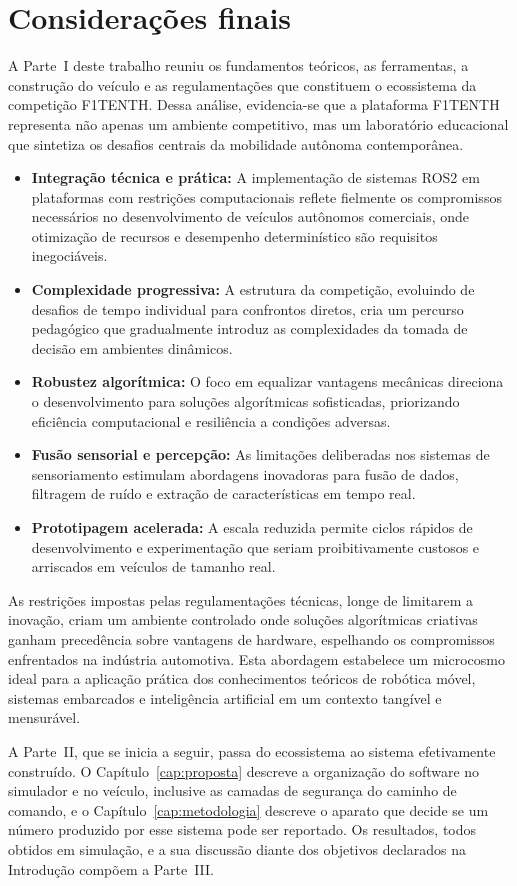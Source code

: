 \chapter{Considerações finais}

A Parte~I deste trabalho reuniu os fundamentos teóricos, as ferramentas, a
construção do veículo e as regulamentações que constituem o ecossistema da
competição F1TENTH. Dessa análise, evidencia-se que a plataforma
F1TENTH representa não apenas um ambiente competitivo, mas um laboratório
educacional que sintetiza os desafios centrais da mobilidade autônoma
contemporânea.

\begin{itemize}
    \item \textbf{Integração técnica e prática:} A implementação de sistemas ROS2 em plataformas com restrições computacionais reflete fielmente os compromissos necessários no desenvolvimento de veículos autônomos comerciais, onde otimização de recursos e desempenho determinístico são requisitos inegociáveis.

    \item \textbf{Complexidade progressiva:} A estrutura da competição, evoluindo de desafios de tempo individual para confrontos diretos, cria um percurso pedagógico que gradualmente introduz as complexidades da tomada de decisão em ambientes dinâmicos.

    \item \textbf{Robustez algorítmica:} O foco em equalizar vantagens mecânicas direciona o desenvolvimento para soluções algorítmicas sofisticadas, priorizando eficiência computacional e resiliência a condições adversas.

    \item \textbf{Fusão sensorial e percepção:} As limitações deliberadas nos sistemas de sensoriamento estimulam abordagens inovadoras para fusão de dados, filtragem de ruído e extração de características em tempo real.

    \item \textbf{Prototipagem acelerada:} A escala reduzida permite ciclos rápidos de desenvolvimento e experimentação que seriam proibitivamente custosos e arriscados em veículos de tamanho real.
\end{itemize}

As restrições impostas pelas regulamentações técnicas, longe de limitarem a
inovação, criam um ambiente controlado onde soluções algorítmicas criativas
ganham precedência sobre vantagens de hardware, espelhando os compromissos
enfrentados na indústria automotiva. Esta abordagem estabelece um microcosmo
ideal para a aplicação prática dos conhecimentos teóricos de robótica móvel,
sistemas embarcados e inteligência artificial em um contexto tangível e
mensurável.

A Parte~II, que se inicia a seguir, passa do ecossistema ao sistema
efetivamente construído. O Capítulo~\ref{cap:proposta} descreve a organização do
software no simulador e no veículo, inclusive as camadas de segurança do
caminho de comando, e o Capítulo~\ref{cap:metodologia} descreve o aparato que
decide se um número produzido por esse sistema pode ser reportado. Os
resultados, todos obtidos em simulação, e a sua discussão diante dos objetivos
declarados na Introdução compõem a Parte~III.